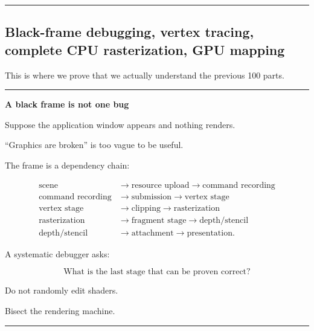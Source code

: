\begin{center}\rule{0.5\linewidth}{0.5pt}\end{center}

\subsection{Black-frame debugging, vertex tracing, complete CPU rasterization, GPU mapping}\label{03-visual-computing-i-ch014-black-frame-debugging-vertex-tracing-complete-cpu-rasterization-gpu-mapping}

\hypertarget{03-visual-computing-i-ch014-black-frame-debugging-vertex-tracing-complete-cpu-rasterization-gpu-mapping}{}

This is where we prove that we actually understand the previous 100 parts.

\begin{center}\rule{0.5\linewidth}{0.5pt}\end{center}

\textbf{A black frame is not one bug}

Suppose the application window appears and nothing renders.

``Graphics are broken'' is too vague to be useful.

The frame is a dependency chain:

\[\begin{aligned}\text{scene} &\rightarrow \text{resource upload} \rightarrow \text{command recording} \\\text{command recording} &\rightarrow \text{submission} \rightarrow \text{vertex stage} \\\text{vertex stage} &\rightarrow \text{clipping} \rightarrow \text{rasterization} \\\text{rasterization} &\rightarrow \text{fragment stage} \rightarrow \text{depth/stencil} \\\text{depth/stencil} &\rightarrow \text{attachment} \rightarrow \text{presentation}.\end{aligned}\]

A systematic debugger asks:

\[
\boxed{
\text{What is the last stage that can be proven correct?}
}
\]

Do not randomly edit shaders.

Bisect the rendering machine.

\begin{center}\rule{0.5\linewidth}{0.5pt}\end{center}

